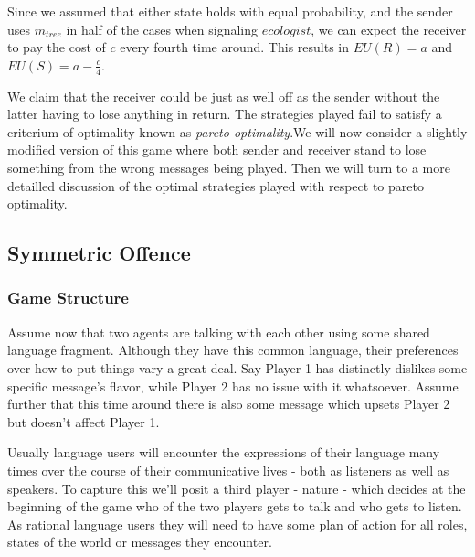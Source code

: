 \documentclass[10]{article}
\begin{document}
Since we assumed that either state holds with equal probability, and the sender uses $m_{tree}$ in half of the cases when signaling $ecologist$, we can expect the receiver to pay the cost of $c$ every fourth time around. This results in $EU(R)=a$ and $EU(S)=a-\tfrac{c}{4}$.

We claim that the receiver could be just as well off as the sender without the latter having to lose anything in return. The strategies played fail to satisfy a criterium of optimality known as \textit{pareto optimality}.We will now consider a slightly modified version of this game where both sender and receiver stand to lose something from the wrong messages being played. Then we will turn to a more detailled discussion of the optimal strategies played with respect to pareto optimality.

\subsection{Symmetric Offence}
\subsubsection{Game Structure}
Assume now that two agents are talking with each other using some shared language fragment. Although they have this common language, their preferences over how to put things vary a great deal. Say Player 1 has distinctly dislikes some specific message's flavor, while Player 2 has no issue with it whatsoever. Assume further that this time around there is also some message which upsets Player 2 but doesn't affect Player 1.

Usually language users will encounter the expressions of their language many times over the course of their communicative lives - both as listeners as well as speakers. To capture this we'll posit a third player - nature - which decides at the beginning of the game who of the two players gets to talk and who gets to listen. As rational language users they will need to have some plan of action for all roles, states of the world or messages they encounter.
\end{document}
